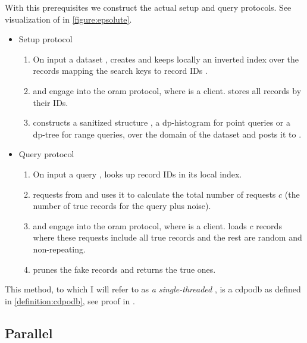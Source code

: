 			With this prerequisites we construct the actual setup and query protocols.
			See visualization of \protocolQuery{} in \cref{figure:epsolute}.
			\begin{itemize}
				\item
					Setup protocol \protocolSetup{}
					\begin{enumerate}
						\item
							On input a dataset \database{}, \user{} creates and keeps locally an inverted index over the records mapping the search keys \searchKey{} to record IDs \recordID{}.
						\item
							\user{} and \server{} engage into the \acrshort{oram} protocol, where \user{} is a client.
							\user{} stores all records by their IDs.
						\item
							\user{} constructs a sanitized structure \serverDS{}, a \acrshort{dp}-histogram for point queries or a \acrshort{dp}-tree for range queries, over the domain of the dataset and posts it to \server{}.
					\end{enumerate}
				\item
					Query protocol \protocolQuery{}
					\begin{enumerate}
						\item
							On input a query \query{}, \user{} looks up record IDs in its local index.
						\item
							\user{} requests \serverDS{} from \server{} and uses it to calculate the total number of requests $c$ (the number of true records for the query plus noise).
						\item
							\user{} and \server{} engage into the \acrshort{oram} protocol, where \user{} is a client.
							\user{} loads $c$ records where these requests include all true records and the rest are random and non-repeating.
						\item
							\user{} prunes the fake records and returns the true ones.
					\end{enumerate}
			\end{itemize}

			

			This method, to which I will refer to as \emph{a single-threaded \epsolute{}}, is a \acrlong{cdpodb} as defined in \cref{definition:cdpodb}, see proof in \cite[Section 4.2]{epsolute}.

		\subsection{Parallel \epsolute{}}\label{section:range-queries-persistent:parallel-epsolute}
